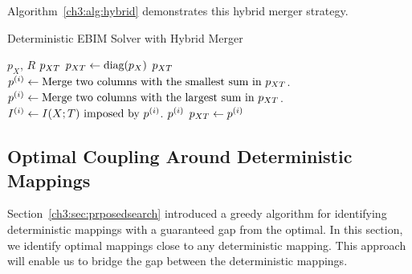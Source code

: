 Algorithm~\ref{ch3:alg:hybrid} demonstrates this hybrid merger strategy.

\begin{algorithm}
\caption{Deterministic EBIM Solver with Hybrid Merger}\label{ch3:alg:hybrid}
\begin{algorithmic}[1]
    
    \Require $p_X$, $R$
    \Ensure $p_{XT}$
    \State $p_{XT} \gets \text{diag}(p_X)$
        \State \Return $p_{XT}$
    \EndIf
        \State $p^{(i)} \gets \text{Merge two columns with the smallest sum in } p_{XT}$.
    \Else
        \State $p^{(i)} \gets \text{Merge two columns with the largest sum in } p_{XT}$.
    \EndIf
    \State $I^{(i)} \gets I(X;T) \text{ imposed by } p^{(i)}$.
        \State \Return $p^{(i)}$
    \Else
        \State $p_{XT} \gets p^{(i)}$
    \EndIf
    \EndFor
\end{algorithmic}
\end{algorithm}
\FloatBarrier

\subsection{Optimal Coupling Around Deterministic Mappings}\label{ch3:sec:neighborhood}

Section~\ref{ch3:sec:prposedsearch} introduced a greedy algorithm for identifying deterministic mappings with a guaranteed gap from the optimal. In this section, we identify optimal mappings close to any deterministic mapping. This approach will enable us to bridge the gap between the deterministic mappings.

